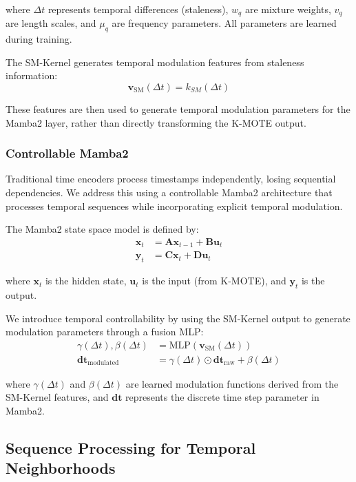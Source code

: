 \documentclass[conference]{IEEEtran}
\begin{document}
where $\Delta t$ represents temporal differences (staleness), $w_q$ are mixture weights, $v_q$ are length scales, and $\mu_q$ are frequency parameters. All parameters are learned during training.

The SM-Kernel generates temporal modulation features from staleness information:
\begin{equation}
\mathbf{v}_{\text{SM}}(\Delta t) = k_{SM}(\Delta t)
\end{equation}

These features are then used to generate temporal modulation parameters for the Mamba2 layer, rather than directly transforming the K-MOTE output.

\subsubsection{Controllable Mamba2}

Traditional time encoders process timestamps independently, losing sequential dependencies. We address this using a controllable Mamba2 architecture that processes temporal sequences while incorporating explicit temporal modulation.

The Mamba2 state space model is defined by:
\begin{align}
\mathbf{x}_t &= \mathbf{A} \mathbf{x}_{t-1} + \mathbf{B} \mathbf{u}_t \\
\mathbf{y}_t &= \mathbf{C} \mathbf{x}_t + \mathbf{D} \mathbf{u}_t
\end{align}

where $\mathbf{x}_t$ is the hidden state, $\mathbf{u}_t$ is the input (from K-MOTE), and $\mathbf{y}_t$ is the output.

We introduce temporal controllability by using the SM-Kernel output to generate modulation parameters through a fusion MLP:
\begin{align}
\gamma(\Delta t), \beta(\Delta t) &= \text{MLP}(\mathbf{v}_{\text{SM}}(\Delta t)) \\
\mathbf{dt}_{\text{modulated}} &= \gamma(\Delta t) \odot \mathbf{dt}_{\text{raw}} + \beta(\Delta t)
\end{align}

where $\gamma(\Delta t)$ and $\beta(\Delta t)$ are learned modulation functions derived from the SM-Kernel features, and $\mathbf{dt}$ represents the discrete time step parameter in Mamba2.

\subsection{Sequence Processing for Temporal Neighborhoods}
\end{document}
